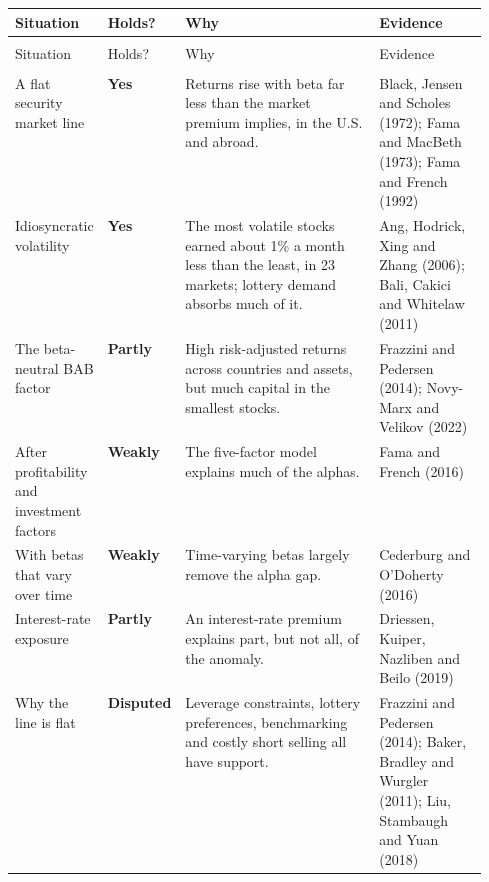 {\small
\begin{longtable}{@{}>{\raggedright\arraybackslash}p{0.19\linewidth}>{\raggedright\arraybackslash}p{0.13\linewidth}>{\raggedright\arraybackslash}p{}>{\raggedright\arraybackslash}p{0.23\linewidth}@{}}
\toprule
Situation & Holds? & Why & Evidence \\
\midrule
\endfirsthead
\multicolumn{4}{@{}l}{\emph{(continued)}} \\
\toprule
Situation & Holds? & Why & Evidence \\
\midrule
\endhead
\midrule
\multicolumn{4}{r@{}}{\emph{(continued on the next page)}} \\
\endfoot
\bottomrule
\endlastfoot
A flat security market line & \textbf{Yes} & Returns rise with beta far less than the market premium implies, in the U.S. and abroad. & Black, Jensen and Scholes (1972); Fama and MacBeth (1973); Fama and French (1992) \\*
\addlinespace[3pt]
Idiosyncratic volatility & \textbf{Yes} & The most volatile stocks earned about 1\% a month less than the least, in 23 markets; lottery demand absorbs much of it. & Ang, Hodrick, Xing and Zhang (2006); Bali, Cakici and Whitelaw (2011) \\
\addlinespace[3pt]
The beta-neutral BAB factor & \textbf{Partly} & High risk-adjusted returns across countries and assets, but much capital in the smallest stocks. & Frazzini and Pedersen (2014); Novy-Marx and Velikov (2022) \\
\addlinespace[3pt]
After profitability and investment factors & \textbf{Weakly} & The five-factor model explains much of the alphas. & Fama and French (2016) \\
\addlinespace[3pt]
With betas that vary over time & \textbf{Weakly} & Time-varying betas largely remove the alpha gap. & Cederburg and O'Doherty (2016) \\
\addlinespace[3pt]
Interest-rate exposure & \textbf{Partly} & An interest-rate premium explains part, but not all, of the anomaly. & Driessen, Kuiper, Nazliben and Beilo (2019) \\*
\addlinespace[3pt]
Why the line is flat & \textbf{Disputed} & Leverage constraints, lottery preferences, benchmarking and costly short selling all have support. & Frazzini and Pedersen (2014); Baker, Bradley and Wurgler (2011); Liu, Stambaugh and Yuan (2018) \\
\end{longtable}
\addtocounter{table}{-1}%
}

